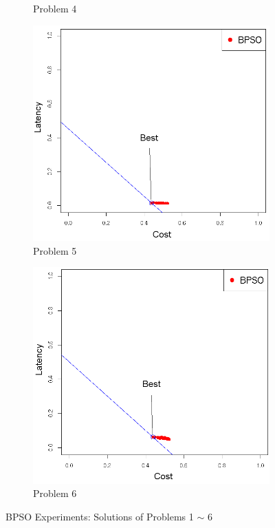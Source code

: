 \begin{figure}[!h]
\begin{subfigure}{0.3\textwidth}
	   \caption{Problem 4}
   \end{subfigure}
      \begin{subfigure}{0.3\textwidth}
       \includegraphics[width=\textwidth]{pics/binary5.png}
	   \caption{Problem 5}
   \end{subfigure}
      \begin{subfigure}{0.3\textwidth}
       \includegraphics[width=\textwidth]{pics/binary6.png}
	   \caption{Problem 6}
   \end{subfigure}
   \caption{BPSO Experiments: Solutions of Problems 1 $\sim$ 6}
   \label{fig:bpso_experiments}
\end{figure}



